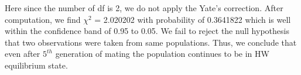 \documentclass[nofonts,]{tufte-handout}
\begin{document}
Here since the number of df is 2, we do not apply the Yate's correction.
After computation, we find \(\chi^2\) = 2.020202 with probability of
0.3641822 which is well within the confidence band of 0.95 to 0.05. We
fail to reject the null hypothesis that two observations were taken from
same populations. Thus, we conclude that even after \(5^{th}\)
generation of mating the population continues to be in HW equilibrium
state.


\end{document}
